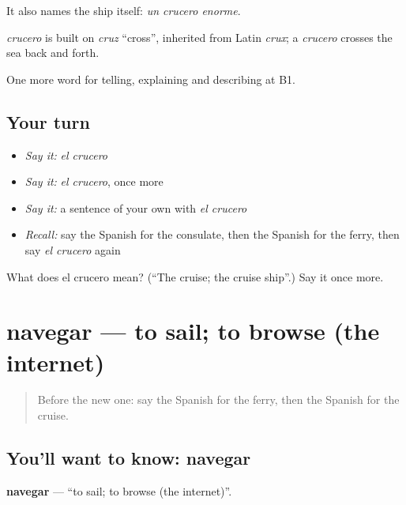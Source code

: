 It also names the ship itself: \emph{un crucero enorme}.

\begin{cousinweb}
\emph{crucero} is built on \emph{cruz} \textquotedblleft{}cross\textquotedblright{}, inherited from Latin \emph{crux}; a \emph{crucero} crosses the sea back and forth.
\end{cousinweb}

\begin{grammarlens}[title={What you've built}]
One more word for telling, explaining and describing at B1.
\end{grammarlens}

\subsection*{Your turn}
\begin{itemize}
\raggedright
  \item \emph{Say it:} \emph{el crucero}
  \item \emph{Say it:} \emph{el crucero}, once more
  \item \emph{Say it:} a sentence of your own with \emph{el crucero}
  \item \emph{Recall:} say the Spanish for the consulate, then the Spanish for the ferry, then say \emph{el crucero} again
\end{itemize}

\begin{tcolorbox}[breakable,colback=teal!4,colframe=teal!35!black,title={Before you move on}]
What does el crucero mean? (\textquotedblleft{}The cruise; the cruise ship\textquotedblright{}.) Say it once more.
\end{tcolorbox}
\section[navegar]{navegar — to sail; to browse (the internet)}

\label{lesson:ES-C658-navegar}



\begin{quote}
Before the new one: say the Spanish for the ferry, then the Spanish for the cruise.
\end{quote}

\subsection*{You'll want to know: navegar}
\textbf{navegar} — \textquotedblleft{}to sail; to browse (the internet)\textquotedblright{}.

